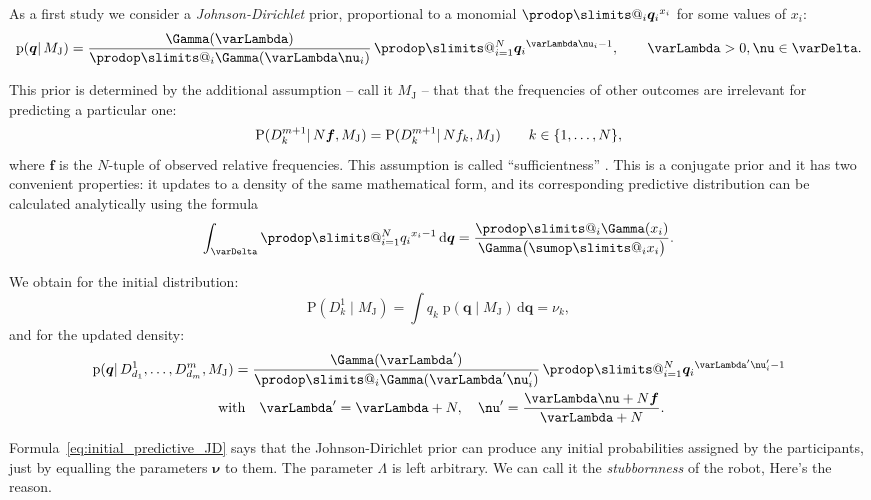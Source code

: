\documentclass[\ifafour a4paper,12pt,\else a5paper,10pt,\fi%
onecolumn,oneside,article,%
british%
]{memoir}
\makeatletter
\theoremstyle{remark}
\theoremstyle{innote}
\def\sum{\DOTSI\sumop\slimits@}
\def\prod{\DOTSI\prodop\slimits@}
\newcommand*{\citep}{\parencites}
\newcommand*{\citey}{\parencites*}
\renewcommand*{\cites}{\parencites}
\newcommand*{\di}{\mathrm{d}}%
\DeclarePairedDelimiter\set{\{}{\}}
\newcommand*{\pf}{\mathrm{p}}%
\newcommand*{\p}{\mathrm{P}}%
\renewcommand*{\|}{\mathpunct{|}}
\newcommand*{\chap}{ch.}%
\newcommand*{\tsum}{\mathop{\textstyle\sum}\nolimits}
\newcommand*{\simpl}{\varDelta}
\newcommand*{\yqq}{q}
\newcommand*{\yq}{\bm{\yqq}}
\newcommand*{\yff}{f}
\newcommand*{\yf}{\bm{\yff}}
\newcommand*{\yMJ}{M_{\text{J}}}
\newcommand*{\yN}{\varLambda}
\newcommand*{\ynn}{\nu}
\newcommand*{\yn}{\bm{\nu}}
\makeatother
\begin{document}
As a first study we consider a \emph{Johnson-Dirichlet} prior,
proportional to a monomial $\prod_i{\yq_i}^{x_i}$ for some values of $x_i$:
\begin{equation}
  \label{eq:JD_prior}
  \pf(\yq \| \yMJ) =
  \frac{\Gamma(\yN)}{\prod_i \Gamma(\yN\ynn_i)}\,
  \prod_{i=1}^N{\yq_i}^{\yN\ynn_i-1}, \qquad \yN>0, \ynn \in \simpl.
\end{equation}

This prior is determined by the additional assumption -- call it $\yMJ$ --
that that the frequencies of other outcomes are irrelevant for predicting a
particular one:
\begin{equation}
  \label{eq:sufficientness}
  \p(D^{m+1}_k \| N\yf, \yMJ) = \p(D^{m+1}_k \| N\yff_{k}, \yMJ)
  \qquad k\in\set{1,\dotsc, N},
\end{equation}
where $\yf$ is the $N$-tuple of observed relative frequencies. This
assumption is called \enquote{sufficientness}
\cites{johnson1924,johnson1932c}[\chap~4]{good1965}{zabell1982,jaynes1986d_r1996}.
This is a conjugate prior
\cites[\chap~9]{degroot1970_r2004}{diaconisetal1979b} and it has two convenient
properties: it updates to a density of the same mathematical form, and its
corresponding predictive distribution can be calculated analytically using
the formula
\begin{equation}
  \label{eq:Dirichlet_formula}
  \int_{\simpl} \prod_{i=1}^N {\yqq_{i}}^{x_i-1}\,\di\yq = \frac{\prod_i \Gamma(x_i)}{\Gamma\bigl(\sum_i x_i\bigr)}.
\end{equation}

We obtain for the initial distribution:
\begin{equation}
  \label{eq:initial_predictive_JD}
  \p(D^1_{k} \| \yMJ) = \int \yqq_{k}\; \pf(\yq \| \yMJ)\,\di\yq
  = \ynn_k,
\end{equation}
and for the updated density:
\begin{multline}
  \label{eq:update_prior_JD}
  \pf(\yq \| D^1_{d_1}, \dotsc, D^m_{d_m}, \yMJ)
  = 
  \frac{\Gamma(\yN')}{\prod_i \Gamma(\yN'\ynn_i')}\,
  \prod_{i=1}^N{\yq_i}^{\yN'\ynn_i'-1}
  \\\
  \text{with}\quad \yN' =\yN+N,\quad
  \yn'=\frac{\yN\yn+N\yf}{\yN+N}.
\end{multline}

Formula~\eqref{eq:initial_predictive_JD} says that the Johnson-Dirichlet
prior can produce any initial probabilities assigned by the participants,
just by equalling the parameters $\yn$ to them. The parameter $\yN$ is left
arbitrary. We can call it the \emph{stubbornness} of the robot, Here's the reason.
\end{document}
